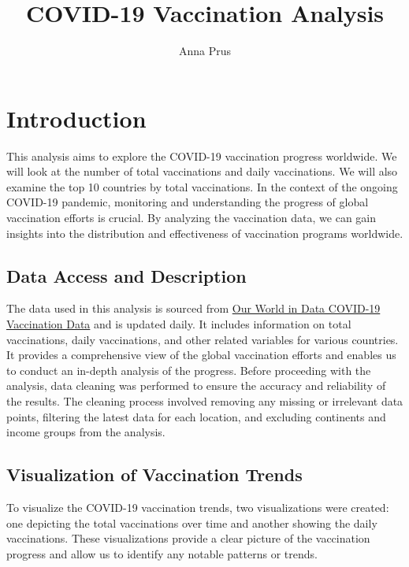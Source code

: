 \documentclass[
  10pt,
  dvipsnames,enabledeprecatedfontcommands]{scrartcl}
\title{COVID-19 Vaccination Analysis}
\author{Anna Prus}
\date{}
\begin{document}
\maketitle

\hypertarget{introduction}{%
\section{Introduction}\label{introduction}}

This analysis aims to explore the COVID-19 vaccination progress
worldwide. We will look at the number of total vaccinations and daily
vaccinations. We will also examine the top 10 countries by total
vaccinations. In the context of the ongoing COVID-19 pandemic,
monitoring and understanding the progress of global vaccination efforts
is crucial. By analyzing the vaccination data, we can gain insights into
the distribution and effectiveness of vaccination programs worldwide.

\hypertarget{data-access-and-description}{%
\subsection{Data Access and
Description}\label{data-access-and-description}}

The data used in this analysis is sourced from
\href{https://ourworldindata.org/covid-vaccinations}{Our World in Data
COVID-19 Vaccination Data} and is updated daily. It includes information
on total vaccinations, daily vaccinations, and other related variables
for various countries. It provides a comprehensive view of the global
vaccination efforts and enables us to conduct an in-depth analysis of
the progress. Before proceeding with the analysis, data cleaning was
performed to ensure the accuracy and reliability of the results. The
cleaning process involved removing any missing or irrelevant data
points, filtering the latest data for each location, and excluding
continents and income groups from the analysis.

\hypertarget{visualization-of-vaccination-trends}{%
\subsection{Visualization of Vaccination
Trends}\label{visualization-of-vaccination-trends}}

To visualize the COVID-19 vaccination trends, two visualizations were
created: one depicting the total vaccinations over time and another
showing the daily vaccinations. These visualizations provide a clear
picture of the vaccination progress and allow us to identify any notable
patterns or trends.
\end{document}
